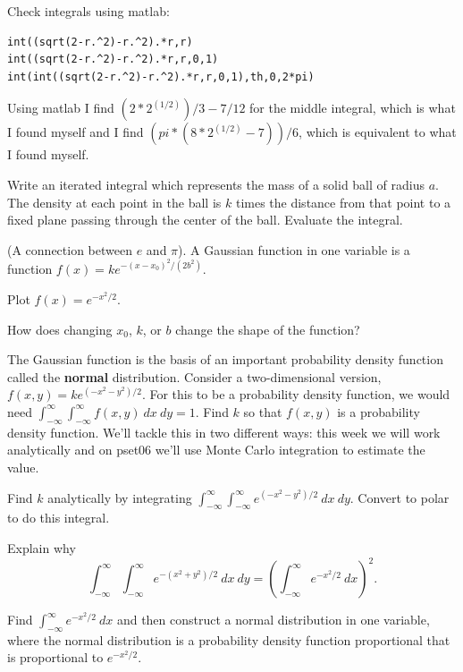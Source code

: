 \documentclass[12pt,letterpaper,noanswers]{exam}
\begin{document}
\begin{questions}
\begin{parts}
\begin{solution}
Check integrals using matlab:
\begin{verbatim}
int((sqrt(2-r.^2)-r.^2).*r,r)
int((sqrt(2-r.^2)-r.^2).*r,r,0,1)
int(int((sqrt(2-r.^2)-r.^2).*r,r,0,1),th,0,2*pi)
\end{verbatim}
Using matlab I find $(2*2^(1/2))/3 - 7/12$ for the middle integral, which is what I found myself and I find $(pi*(8*2^(1/2) - 7))/6$, which is equivalent to what I found myself.
\end{solution}
\end{parts}


\item Write an iterated integral which represents the mass of a solid ball of radius $a$.  The density at each point in the ball is $k$ times the distance from that point to a fixed plane passing through the center of the ball.  Evaluate the integral.


\question (A connection between $e$ and $\pi$).
A Gaussian function in one variable is a function $f(x) = ke^{-(x-x_0)^2/(2b^2)}$.  

\begin{parts}
\item Plot $f(x) = e^{-x^2/2}$.
\item How does changing $x_0$, $k$, or $b$ change the shape of the function?

\vspace{0.2cm}

 The Gaussian function is the basis of an important probability density function called the \textbf{normal} distribution.   Consider a two-dimensional version, $f(x,y) = k e^{(-x^2-y^2)/2}$.  For this to be a probability density function, we would need $\int_{-\infty}^\infty\int_{-\infty}^\infty f(x,y)\ dx\ dy = 1$.  Find $k$ so that $f(x,y)$ is a probability density function.  We'll tackle this in two different ways: this week we will work analytically and on pset06 we'll use Monte Carlo integration to estimate the value.
\item Find $k$ analytically by integrating $\displaystyle\int_{-\infty}^\infty\int_{-\infty}^\infty e^{(-x^2-y^2)/2}\ dx\ dy$.  Convert to polar to do this integral.

\item Explain why \[\int_{-\infty}^{\infty}\int_{-\infty}^{\infty} e^{-(x^2+y^2)/2}\ dx\ dy = \left(\int_{-\infty}^{\infty}e^{-x^2/2}\ dx\right)^2.\]

\item Find $\displaystyle\int_{-\infty}^{\infty}e^{-x^2/2}\ dx$ and then construct a normal distribution in one variable, where the normal distribution is a probability density function proportional that is proportional to $e^{-x^2/2}$.
\end{parts}



\end{questions}
\end{document}
